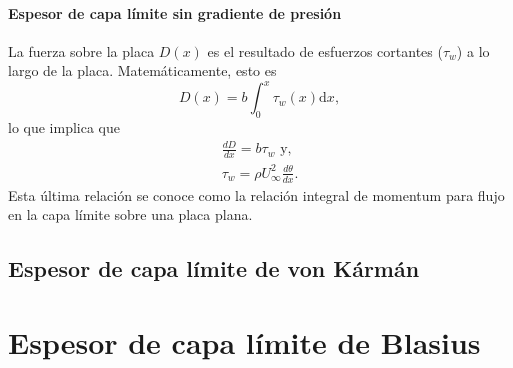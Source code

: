 \paragraph*{Espesor de capa límite sin gradiente de presión}

La fuerza sobre la placa $D(x)$ es el resultado de esfuerzos cortantes ($\tau_w$) a lo largo de la placa.
Matemáticamente, esto es
%
\begin{equation}
D(x) = b\int_0^x \tau_w(x)\mathrm{d}x,
\end{equation}
%
lo que implica que
%
\begin{align}
\frac{dD}{dx}=b\tau_w \text{ y, }\nonumber\\
\tau_w=\rho U_\infty^2 \frac{d\theta}{dx}.
\end{align}
%
Esta última relación se conoce como la relación integral de momentum para flujo en la capa límite sobre una placa plana.

\subsection*{Espesor de capa límite de von Kármán}

\section*{Espesor de capa límite de Blasius}


